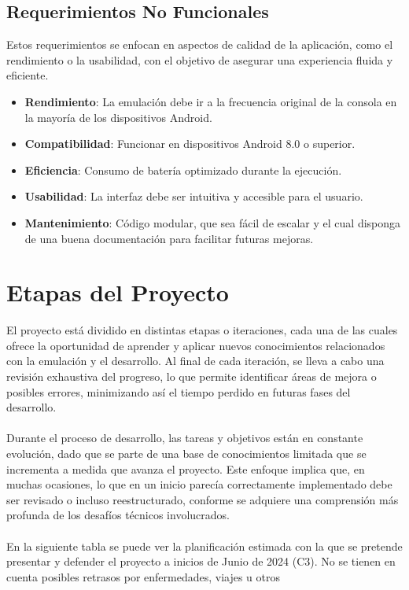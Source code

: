 \subsection{Requerimientos No Funcionales}

Estos requerimientos se enfocan en aspectos de calidad de la aplicación, como el rendimiento o la usabilidad, con el objetivo de asegurar una experiencia fluida y eficiente.

\begin{itemize}
    \item \textbf{Rendimiento}: La emulación debe ir a la frecuencia original de la consola en la mayoría de los dispositivos Android.
    \item \textbf{Compatibilidad}: Funcionar en dispositivos Android 8.0 o superior.
    \item \textbf{Eficiencia}: Consumo de batería optimizado durante la ejecución.
    \item \textbf{Usabilidad}: La interfaz debe ser intuitiva y accesible para el usuario.
    \item \textbf{Mantenimiento}: Código modular, que sea fácil de escalar y el cual disponga de una buena documentación para facilitar futuras mejoras.
\end{itemize}

\section{Etapas del Proyecto}
El proyecto está dividido en distintas etapas o iteraciones, cada una de las cuales ofrece la oportunidad de aprender y aplicar nuevos conocimientos relacionados con la emulación y el desarrollo. Al final de cada iteración, se lleva a cabo una revisión exhaustiva del progreso, lo que permite identificar áreas de mejora o posibles errores, minimizando así el tiempo perdido en futuras fases del desarrollo.
\\\\
Durante el proceso de desarrollo, las tareas y objetivos están en constante evolución, dado que se parte de una base de conocimientos limitada que se incrementa a medida que avanza el proyecto. Este enfoque implica que, en muchas ocasiones, lo que en un inicio parecía correctamente implementado debe ser revisado o incluso reestructurado, conforme se adquiere una comprensión más profunda de los desafíos técnicos involucrados.
\\\\
En la siguiente tabla se puede ver la planificación estimada con la que se pretende presentar y defender el proyecto a inicios de Junio de 2024 (C3). No se tienen en cuenta posibles retrasos por enfermedades, viajes u otros

